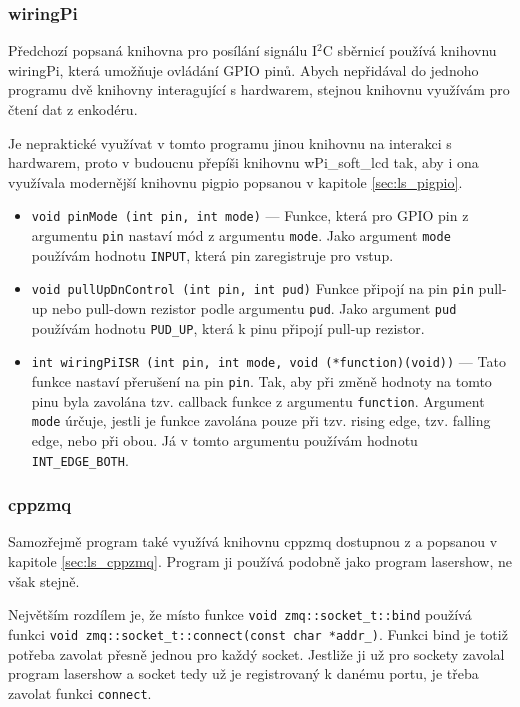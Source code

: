 \subsubsection{wiringPi}
Předchozí popsaná knihovna pro posílání signálu I$^{2}$C sběrnicí používá knihovnu wiringPi, která umožňuje ovládání GPIO pinů. Abych nepřidával do jednoho programu dvě knihovny interagující s hardwarem, stejnou knihovnu využívám pro čtení dat z enkodéru.

Je nepraktické využívat v tomto programu jinou knihovnu na interakci s hardwarem, proto v budoucnu přepíši knihovnu wPi\_soft\_lcd tak, aby i ona využívala modernější knihovnu pigpio popsanou v kapitole \ref{sec:ls_pigpio}.

\begin{itemize}
\item \texttt{void pinMode (int pin, int mode)} --- Funkce, která pro GPIO pin z argumentu \texttt{pin} nastaví mód z argumentu \texttt{mode}. Jako argument \texttt{mode} používám hodnotu \texttt{INPUT}, která pin zaregistruje pro vstup.
\item \texttt{void pullUpDnControl (int pin, int pud)} Funkce připojí na pin \texttt{pin} pull-up nebo pull-down rezistor podle argumentu \texttt{pud}. Jako argument \texttt{pud} používám hodnotu \texttt{PUD_UP}, která k pinu připojí pull-up rezistor.
\item \texttt{int wiringPiISR (int pin, int mode, void (*function)(void))} --- Tato funkce nastaví přerušení na pin \texttt{pin}. Tak, aby při změně hodnoty na tomto pinu byla zavolána tzv. callback funkce z argumentu \texttt{function}. Argument \texttt{mode} úrčuje, jestli je funkce zavolána pouze při tzv. rising edge, tzv. falling edge, nebo při obou. Já v tomto argumentu používám hodnotu \texttt{INT_EDGE_BOTH}.
\end{itemize}

\subsubsection{cppzmq}
Samozřejmě program také využívá knihovnu cppzmq dostupnou z \cite{cppzmq} a popsanou v kapitole \ref{sec:ls_cppzmq}. Program ji používá podobně jako program lasershow, ne však stejně.

Největším rozdílem je, že místo funkce \texttt{void zmq::socket_t::bind} používá funkci \texttt{void zmq::socket_t::connect(const char *addr_)}.
Funkci bind je totiž potřeba zavolat přesně jednou pro každý socket.
Jestliže ji už pro sockety zavolal program lasershow a socket tedy už je registrovaný k danému portu, je třeba zavolat funkci \texttt{connect}.


